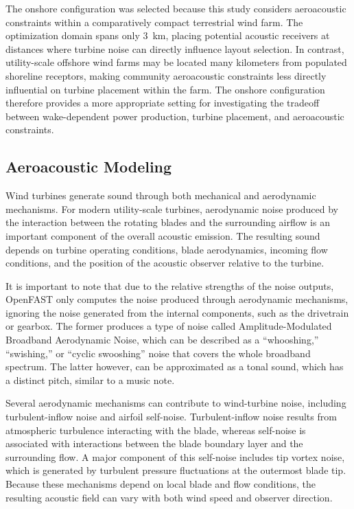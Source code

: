 \documentclass[11pt]{article}
\begin{document}
The onshore configuration was selected because this study considers aeroacoustic constraints within a comparatively compact terrestrial wind farm. The optimization domain spans only 3~km, placing potential acoustic receivers at distances where turbine noise can directly influence layout selection. In contrast, utility-scale offshore wind farms may be located many kilometers from populated shoreline receptors, making community aeroacoustic constraints less directly influential on turbine placement within the farm. The onshore configuration therefore provides a more appropriate setting for investigating the tradeoff between wake-dependent power production, turbine placement, and aeroacoustic constraints.

\subsection{Aeroacoustic Modeling}

Wind turbines generate sound through both mechanical and aerodynamic mechanisms. For modern utility-scale turbines, aerodynamic noise produced by the interaction between the rotating blades and the surrounding airflow is an important component of the overall acoustic emission. The resulting sound depends on turbine operating conditions, blade aerodynamics, incoming flow conditions, and the position of the acoustic observer relative to the turbine.

It is important to note that due to the relative strengths of the noise outputs, OpenFAST only computes the noise produced through aerodynamic mechanisms, ignoring the noise generated from the internal components, such as the drivetrain or gearbox. The former produces a type of noise called Amplitude-Modulated Broadband Aerodynamic Noise, which can be described as a ``whooshing,'' ``swishing,'' or ``cyclic swooshing'' noise that covers the whole broadband spectrum. The latter however, can be approximated as a tonal sound, which has a distinct pitch, similar to a music note. 

Several aerodynamic mechanisms can contribute to wind-turbine noise, including turbulent-inflow noise and airfoil self-noise. Turbulent-inflow noise results from atmospheric turbulence interacting with the blade, whereas self-noise is associated with interactions between the blade boundary layer and the surrounding flow. A major component of this self-noise includes tip vortex noise, which is generated by turbulent pressure fluctuations at the outermost blade tip. Because these mechanisms depend on local blade and flow conditions, the resulting acoustic field can vary with both wind speed and observer direction.
\end{document}
